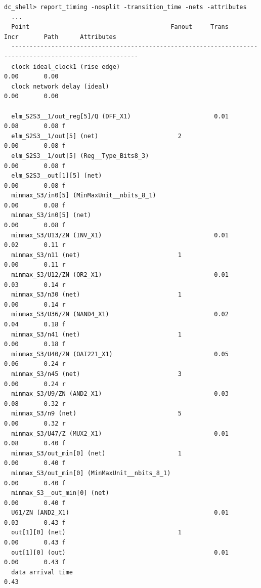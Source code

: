 \documentclass[a4paper,12pt,twoside]{article}
\begin{document}
\begin{verbatim}
dc_shell> report_timing -nosplit -transition_time -nets -attributes
  ...
  Point                                       Fanout     Trans      Incr       Path      Attributes
  ---------------------------------------------------------------------------------------------------------
  clock ideal_clock1 (rise edge)                                    0.00       0.00
  clock network delay (ideal)                                       0.00       0.00

  elm_S2S3__1/out_reg[5]/Q (DFF_X1)                       0.01      0.08       0.08 f
  elm_S2S3__1/out[5] (net)                      2                   0.00       0.08 f
  elm_S2S3__1/out[5] (Reg__Type_Bits8_3)                            0.00       0.08 f
  elm_S2S3__out[1][5] (net)                                         0.00       0.08 f
  minmax_S3/in0[5] (MinMaxUnit__nbits_8_1)                          0.00       0.08 f
  minmax_S3/in0[5] (net)                                            0.00       0.08 f
  minmax_S3/U13/ZN (INV_X1)                               0.01      0.02       0.11 r
  minmax_S3/n11 (net)                           1                   0.00       0.11 r
  minmax_S3/U12/ZN (OR2_X1)                               0.01      0.03       0.14 r
  minmax_S3/n30 (net)                           1                   0.00       0.14 r
  minmax_S3/U36/ZN (NAND4_X1)                             0.02      0.04       0.18 f
  minmax_S3/n41 (net)                           1                   0.00       0.18 f
  minmax_S3/U40/ZN (OAI221_X1)                            0.05      0.06       0.24 r
  minmax_S3/n45 (net)                           3                   0.00       0.24 r
  minmax_S3/U9/ZN (AND2_X1)                               0.03      0.08       0.32 r
  minmax_S3/n9 (net)                            5                   0.00       0.32 r
  minmax_S3/U47/Z (MUX2_X1)                               0.01      0.08       0.40 f
  minmax_S3/out_min[0] (net)                    1                   0.00       0.40 f
  minmax_S3/out_min[0] (MinMaxUnit__nbits_8_1)                      0.00       0.40 f
  minmax_S3__out_min[0] (net)                                       0.00       0.40 f
  U61/ZN (AND2_X1)                                        0.01      0.03       0.43 f
  out[1][0] (net)                               1                   0.00       0.43 f
  out[1][0] (out)                                         0.01      0.00       0.43 f
  data arrival time                                                            0.43


\end{verbatim}
\end{document}
